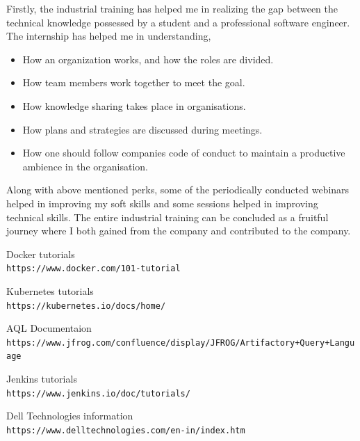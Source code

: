 \documentclass[12pt]{article}
\begin{document}
Firstly, the industrial training has helped me in realizing the gap between the technical knowledge possessed by a student and a professional software engineer. The internship has helped me in understanding,
\begin{itemize}
  \item How an organization works, and how the roles are divided.
 \item How team members work together to meet the goal.
 \item How knowledge sharing takes place in organisations.
 \item How plans and strategies are discussed during meetings.
 \item How one should follow companies code of conduct to maintain a productive ambience in the organisation.
\end{itemize} 

Along with above mentioned perks, some of the periodically conducted webinars helped in improving my soft skills and some sessions helped in improving technical skills.
The entire industrial training can be concluded as a fruitful journey where I both gained from the company and contributed to the company.	
	
	
	\begin{thebibliography}{9}
		Docker tutorials 
		\\\texttt{https://www.docker.com/101-tutorial}
		
		Kubernetes tutorials 
		\\\texttt{https://kubernetes.io/docs/home/}
		
		AQL Documentaion 
		\\\texttt{https://www.jfrog.com/confluence/display/JFROG/Artifactory+Query+Language}
		
		Jenkins tutorials 
		\\\texttt{https://www.jenkins.io/doc/tutorials/}
		
		Dell Technologies information 
		\\\texttt{https://www.delltechnologies.com/en-in/index.htm}
		
		
	\end{thebibliography}
	
	
\end{document}
